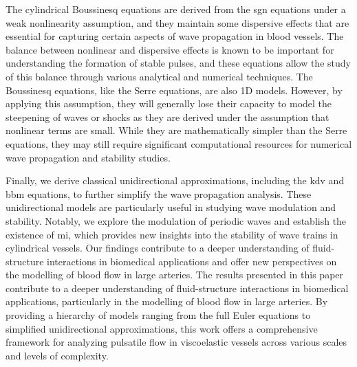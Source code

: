 \documentclass[alpha-refs, 12pt]{wiley-article}
\begin{document}
The cylindrical Boussinesq equations are derived from the \acrshort{sgn} equations under a weak nonlinearity assumption, and they maintain some dispersive effects that are essential for capturing certain aspects of wave propagation in blood vessels. The balance between nonlinear and dispersive effects is known to be important for understanding the formation of stable pulses, and these equations allow the study of this balance through various analytical and numerical techniques. The Boussinesq equations, like the Serre equations, are also 1D models. However, by applying this assumption, they will generally lose their capacity to model the steepening of waves or shocks as they are derived under the assumption that nonlinear terms are small. While they are mathematically simpler than the Serre equations, they may still require significant computational resources for numerical wave propagation and stability studies.

Finally, we derive classical unidirectional approximations, including the \acrfull{kdv} and \acrfull{bbm} equations, to further simplify the wave propagation analysis. These unidirectional models are particularly useful in studying wave modulation and stability. Notably, we explore the modulation of periodic waves and establish the existence of \acrfull{mi}, which provides new insights into the stability of wave trains in cylindrical vessels. Our findings contribute to a deeper understanding of fluid-structure interactions in biomedical applications and offer new perspectives on the modelling of blood flow in large arteries. The results presented in this paper contribute to a deeper understanding of fluid-structure interactions in biomedical applications, particularly in the modelling of blood flow in large arteries. By providing a hierarchy of models ranging from the full Euler equations to simplified unidirectional approximations, this work offers a comprehensive framework for analyzing pulsatile flow in viscoelastic vessels across various scales and levels of complexity.
\end{document}
